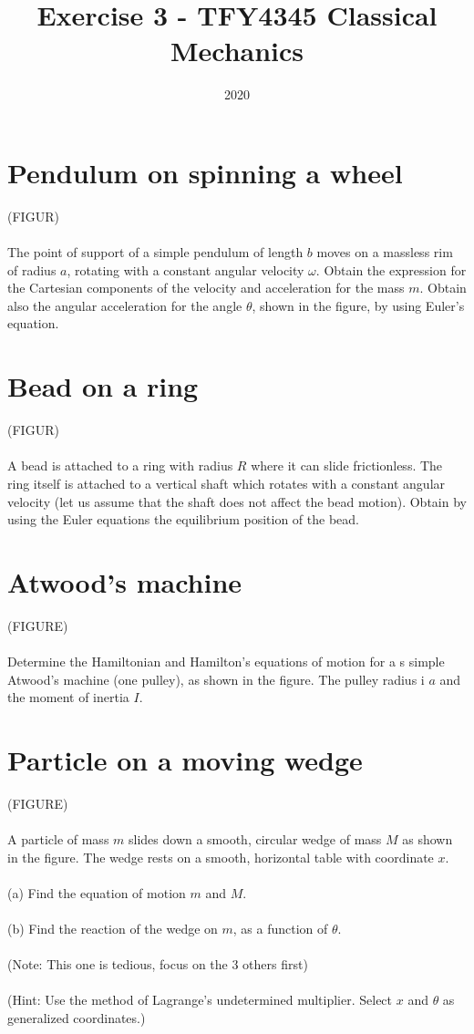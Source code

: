 \documentclass{article}
\title{Exercise 3 - TFY4345 Classical Mechanics}
\date{2020}
\begin{document}
    \maketitle
    \section{Pendulum on spinning a wheel}
    (FIGUR) \\ \\
    The point of support of a simple pendulum of length $b$ moves on a massless rim of radius $a$, rotating with a constant angular velocity $\omega$. Obtain the expression for the Cartesian components of the velocity and acceleration for the mass $m$. Obtain also the angular acceleration for the angle $\theta$, shown in the figure, by using Euler's equation.

    \section{Bead on a ring}
    (FIGUR) \\ \\
    A bead is attached to a ring with radius $R$ where it can slide frictionless. The ring itself is attached to a vertical shaft which rotates with a constant angular velocity (let us assume that the shaft does not affect the bead motion). Obtain by using the Euler equations the equilibrium position of the bead.

    \section{Atwood's machine}
    (FIGURE) \\ \\
    Determine the Hamiltonian and Hamilton's equations of motion for a s simple Atwood's machine (one pulley), as shown in the figure. The pulley radius i $a$ and the moment of inertia $I$.

    \section{Particle on a moving wedge}
    (FIGURE) \\ \\
    A particle of mass $m$ slides down a smooth, circular wedge of mass $M$ as shown in the figure. The wedge rests on a smooth, horizontal table with coordinate $x$. \\ \\
    (a) Find the equation of motion $m$ and $M$. \\ \\
    (b) Find the reaction of the wedge on $m$, as a function of $\theta$. \\ \\
    (Note: This one is tedious, focus on the 3 others first) \\ \\
    (Hint: Use the method of Lagrange's undetermined multiplier. Select $x$ and $\theta$ as generalized coordinates.)
\end{document}
